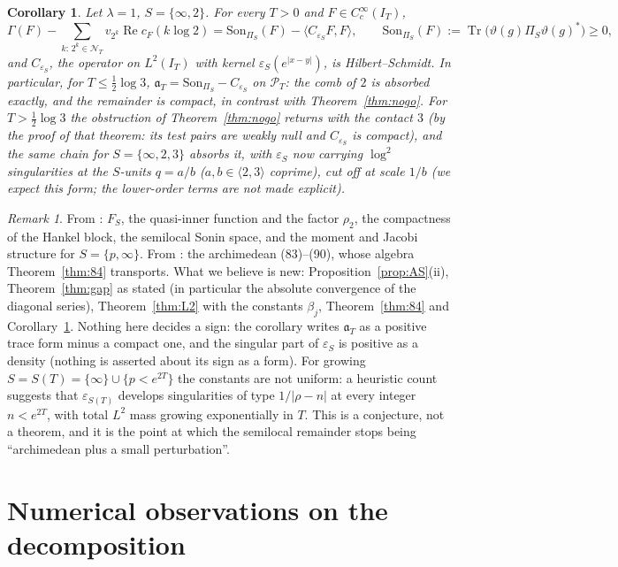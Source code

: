 \documentclass[11pt]{amsart}
\newtheorem{corollary}[theorem]{Corollary}
\theoremstyle{definition}
\theoremstyle{remark}
\newtheorem{remark}[theorem]{Remark}
\newcommand{\Rel}{\operatorname{Re}}
\newcommand{\Tr}{\operatorname{Tr}}
\newcommand{\IT}{I_T}
\newcommand{\PT}{\mathcal P_T}
\newcommand{\cF}{c_F}
\newcommand{\NT}{\mathcal N_T}
\newcommand{\Son}{\mathrm{Son}}
\begin{document}
\begin{corollary}\label{cor:split}
Let $\lambda=1$, $S=\{\infty,2\}$. For every $T>0$ and $F\in C_c^\infty(\IT)$,
\[
\Gamma(F)-\sum_{k:\,2^k\in\NT}v_{2^k}\Rel\cF(k\log2)=\Son_{\Pi_S}(F)-\langle C_{\varepsilon_S}F,F\rangle,\qquad
\Son_{\Pi_S}(F):=\Tr\big(\vartheta(g)\Pi_S\vartheta(g)^*\big)\ge0,
\]
and $C_{\varepsilon_S}$, the operator on $L^2(\IT)$ with kernel $\varepsilon_S(e^{|x-y|})$, is Hilbert--Schmidt. In particular, for
$T\le\frac12\log3$, $\mathfrak a_T=\Son_{\Pi_S}-C_{\varepsilon_S}$ on $\PT$: the comb of $2$ is absorbed exactly, and the remainder
is compact, in contrast with Theorem~\ref{thm:nogo}. For $T>\frac12\log3$ the obstruction of Theorem~\ref{thm:nogo} returns
with the contact $3$ (by the proof of that theorem: its test pairs are weakly null and $C_{\varepsilon_S}$ is compact), and the same chain for $S=\{\infty,2,3\}$ absorbs it, with $\varepsilon_S$ now carrying $\log^2$
singularities at the $S$-units $q=a/b$ ($a,b\in\langle2,3\rangle$ coprime), cut off at scale $1/b$ (we expect this form; the lower-order terms are not made explicit).
\end{corollary}

\begin{remark}
From \cite{CCquasi,CCM2023,CCM2024}: $F_S$, the quasi-inner function and the factor $\rho_2$, the compactness of the Hankel
block, the semilocal Sonin space, and the moment and Jacobi structure for $S=\{p,\infty\}$. From \cite{CC2021}: the
archimedean (83)--(90), whose algebra Theorem~\ref{thm:84} transports. What we believe is new: Proposition~\ref{prop:AS}(ii),
Theorem~\ref{thm:gap} as stated (in particular the absolute convergence of the diagonal series), Theorem~\ref{thm:L2} with the
constants $\beta_j$, Theorem~\ref{thm:84} and Corollary~\ref{cor:split}. Nothing here decides a sign: the corollary writes
$\mathfrak a_T$ as a positive trace form minus a compact one, and the singular part of $\varepsilon_S$ is positive as a density (nothing is
asserted about its sign as a form). For growing $S=S(T)=\{\infty\}\cup\{p<e^{2T}\}$ the constants are not uniform: a
heuristic count suggests that $\varepsilon_{S(T)}$ develops singularities of type $1/|\rho-n|$ at every integer $n<e^{2T}$, with
total $L^2$ mass growing exponentially in $T$. This is a conjecture, not a theorem, and it is the point at which the
semilocal remainder stops being ``archimedean plus a small perturbation''.
\end{remark}

\section{Numerical observations on the decomposition}\label{sec:num}
\end{document}
